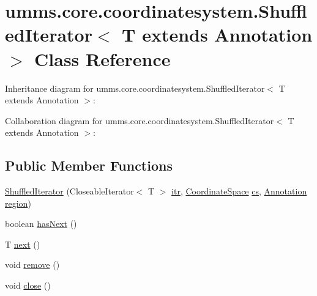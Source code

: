 \hypertarget{classumms_1_1core_1_1coordinatesystem_1_1_shuffled_iterator_3_01_t_01extends_01_annotation_01_4}{\section{umms.\+core.\+coordinatesystem.\+Shuffled\+Iterator$<$ T extends Annotation $>$ Class Reference}
\label{classumms_1_1core_1_1coordinatesystem_1_1_shuffled_iterator_3_01_t_01extends_01_annotation_01_4}
}


Inheritance diagram for umms.\+core.\+coordinatesystem.\+Shuffled\+Iterator$<$ T extends Annotation $>$\+:


Collaboration diagram for umms.\+core.\+coordinatesystem.\+Shuffled\+Iterator$<$ T extends Annotation $>$\+:
\subsection*{Public Member Functions}
\begin{DoxyCompactItemize}
\item 
\hyperlink{classumms_1_1core_1_1coordinatesystem_1_1_shuffled_iterator_3_01_t_01extends_01_annotation_01_4_a9a35f8f619dde289f3c52653ebe6371b}{Shuffled\+Iterator} (Closeable\+Iterator$<$ T $>$ \hyperlink{classumms_1_1core_1_1coordinatesystem_1_1_shuffled_iterator_3_01_t_01extends_01_annotation_01_4_a7bc14e133f323959b7c98ccd5e93a140}{itr}, \hyperlink{interfaceumms_1_1core_1_1coordinatesystem_1_1_coordinate_space}{Coordinate\+Space} \hyperlink{classumms_1_1core_1_1coordinatesystem_1_1_shuffled_iterator_3_01_t_01extends_01_annotation_01_4_a4919b67f1b738b7aee76c0905d23062e}{cs}, \hyperlink{interfaceumms_1_1core_1_1annotation_1_1_annotation}{Annotation} \hyperlink{classumms_1_1core_1_1coordinatesystem_1_1_shuffled_iterator_3_01_t_01extends_01_annotation_01_4_aee6a816042a162c1eb807fdbc770b622}{region})
\item 
boolean \hyperlink{classumms_1_1core_1_1coordinatesystem_1_1_shuffled_iterator_3_01_t_01extends_01_annotation_01_4_ab21523b7b7eb4f5454be34e035e9ba3c}{has\+Next} ()
\item 
T \hyperlink{classumms_1_1core_1_1coordinatesystem_1_1_shuffled_iterator_3_01_t_01extends_01_annotation_01_4_a01127f1eae4d93e5179e2d48360ef225}{next} ()
\item 
void \hyperlink{classumms_1_1core_1_1coordinatesystem_1_1_shuffled_iterator_3_01_t_01extends_01_annotation_01_4_aa95592580ed1b375981597982c35d574}{remove} ()
\item 
void \hyperlink{classumms_1_1core_1_1coordinatesystem_1_1_shuffled_iterator_3_01_t_01extends_01_annotation_01_4_ae137b35ce4ebdd00c1d3406f9f0b818f}{close} ()
\end{DoxyCompactItemize}
